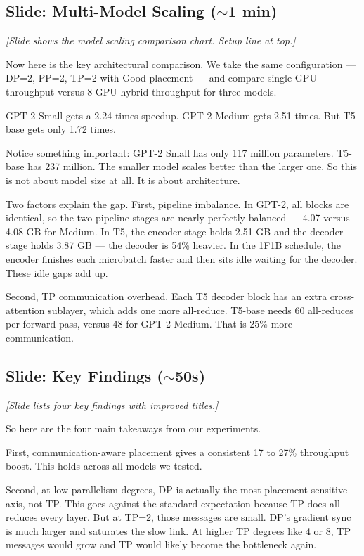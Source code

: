 \documentclass[11pt, a4paper]{article}
\begin{document}
\subsection{Slide: Multi-Model Scaling ($\sim$1 min)}
\textit{[Slide shows the model scaling comparison chart. Setup line at top.]}

Now here is the key architectural comparison. We take the same configuration --- DP=2, PP=2, TP=2 with Good placement --- and compare single-GPU throughput versus 8-GPU hybrid throughput for three models.

GPT-2 Small gets a 2.24 times speedup. GPT-2 Medium gets 2.51 times. But T5-base gets only 1.72 times.

Notice something important: GPT-2 Small has only 117 million parameters. T5-base has 237 million. The smaller model scales better than the larger one. So this is not about model size at all. It is about architecture.

Two factors explain the gap. First, pipeline imbalance. In GPT-2, all blocks are identical, so the two pipeline stages are nearly perfectly balanced --- 4.07 versus 4.08 GB for Medium. In T5, the encoder stage holds 2.51 GB and the decoder stage holds 3.87 GB --- the decoder is 54\% heavier. In the 1F1B schedule, the encoder finishes each microbatch faster and then sits idle waiting for the decoder. These idle gaps add up.

Second, TP communication overhead. Each T5 decoder block has an extra cross-attention sublayer, which adds one more all-reduce. T5-base needs 60 all-reduces per forward pass, versus 48 for GPT-2 Medium. That is 25\% more communication.

\subsection{Slide: Key Findings ($\sim$50s)}
\textit{[Slide lists four key findings with improved titles.]}

So here are the four main takeaways from our experiments.

First, communication-aware placement gives a consistent 17 to 27\% throughput boost. This holds across all models we tested.

Second, at low parallelism degrees, DP is actually the most placement-sensitive axis, not TP. This goes against the standard expectation because TP does all-reduces every layer. But at TP=2, those messages are small. DP's gradient sync is much larger and saturates the slow link. At higher TP degrees like 4 or 8, TP messages would grow and TP would likely become the bottleneck again.
\end{document}
